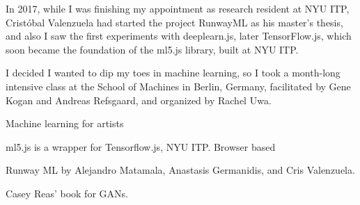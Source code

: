In 2017, while I was finishing my appointment as research resident at NYU ITP, Cristóbal Valenzuela had started the project RunwayML as his master's thesis, and also I saw the first experiments with deeplearn.js, later TensorFlow.js, which soon became the foundation of the ml5.js library, built at NYU ITP.

I decided I wanted to dip my toes in machine learning, so I took a month-long intensive class at the School of Machines in Berlin, Germany, facilitated by Gene Kogan and Andreas Refsgaard, and organized by Rachel Uwa.



Machine learning for artists


ml5.js is a wrapper for Tensorflow.js, NYU ITP. Browser based

Runway ML by Alejandro Matamala, Anastasis Germanidis, and Cris Valenzuela.

Casey Reas' book for GANs.
